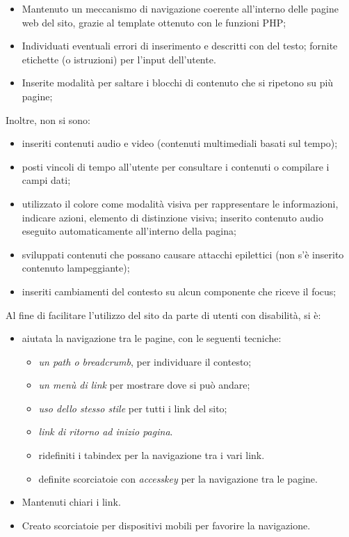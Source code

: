 {{\begin{itemize}
\begin{itemize}
 			\item È stato definito infine un link di ritorno ad inizio pagina.
		\end{itemize} 
		\item Mantenuto un meccanismo di navigazione coerente all'interno delle pagine web del sito, grazie al template ottenuto con le funzioni PHP;
		\item Individuati eventuali errori di inserimento e descritti con del testo; fornite etichette (o istruzioni) per l'input dell'utente.
		\item Inserite modalità per saltare i blocchi di contenuto che si ripetono su più pagine;
	\end{itemize}
	Inoltre, non si sono:
	\begin{itemize}\itemsep1pt
		\item inseriti contenuti audio e video (contenuti multimediali basati sul tempo);
		\item posti vincoli di tempo all'utente per consultare i contenuti o compilare i campi dati;
		\item utilizzato il colore come modalità visiva per rappresentare le informazioni, indicare azioni, elemento di distinzione visiva; inserito contenuto audio eseguito automaticamente all'interno della pagina;
		\item sviluppati contenuti che possano causare attacchi epilettici (non s'è inserito contenuto lampeggiante);
		\item inseriti cambiamenti del contesto su alcun componente che riceve il focus;
	\end{itemize}
		Al fine di facilitare l'utilizzo del sito da parte di utenti con disabilità, si è:
		\begin{itemize}\itemsep1pt
			\item aiutata la navigazione tra le pagine, con le seguenti tecniche:
			\begin{itemize}\itemsep1pt
				\item \textit{un path o breadcrumb}, per individuare il contesto;
				\item \textit{un menù di link} per mostrare dove si può andare;
				\item \textit{uso dello stesso stile} per tutti i link del sito;
				\item \textit{link di ritorno ad inizio pagina}.
				\item ridefiniti i tabindex per la navigazione tra i vari link.
				\item definite scorciatoie con \textit{accesskey} per la navigazione tra le pagine.
			\end{itemize}
			\item Mantenuti chiari i link.
			\item Creato scorciatoie per dispositivi mobili per favorire la navigazione.
		\end{itemize}
	}
}
